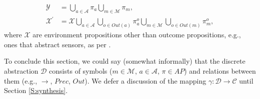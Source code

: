 \begin{subequations}
	\label{ActOutAP}
	\begin{align}
		\mathcal{Y} &= \bigcup \limits_{a \in \mathcal{A}} \pi_a \bigcup \limits_{m \in \mathcal{M}} \pi_m,\\
		\mathcal{X}^\prime &= \mathcal{X} \bigcup \limits_{a \in \mathcal{A}} \bigcup \limits_{o \in Out(a)} \pi_a^o \bigcup \limits_{m \in \mathcal{M}} \bigcup \limits_{o \in Out(m)} \pi_m^o,
	\end{align}
\end{subequations}
where $\mathcal{X}$ are environment propositions other than outcome propositions, e.g., ones that abstract sensors, as per \cite{KGFP_TRO09}.

To conclude this section, we could say (somewhat informally) that the discrete abstraction $\mathcal{D}$ consists of symbols ($m \in \mathcal{M}$, $a \in \mathcal{A}$, $\pi \in AP$) and relations between them (e.g., $\boldsymbol\rightarrow$, $Prec$, $Out$).
We defer a discussion of the mapping $\gamma: \mathcal{D} \rightarrow \mathcal{C}$ until Section \ref{S:synthesis}.

%

